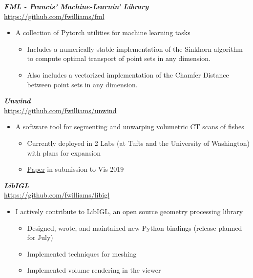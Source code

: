 \documentclass[line,10pt]{res}
\newcommand{\resumetitlemar}{0.5em}
\begin{document}
\begin{resume}
{\sl \textbf{FML - Francis' Machine-Learnin' Library}}\\
\url{https://github.com/fwilliams/fml}
\vspace{\resumetitlemar}
\begin{itemize} \itemsep -2pt
\item A collection of Pytorch utilities for machine learning tasks
\vspace{-0.4em}
\begin{itemize} \itemsep -2pt
\item Includes a numerically stable implementation of the Sinkhorn algorithm to compute optimal transport of point sets in any dimension.
\item Also includes a vectorized implementation of the Chamfer Distance between point sets in any dimension.
\end{itemize}
\end{itemize}

{\sl \textbf{Unwind}}\\
\url{https://github.com/fwilliams/unwind}
\vspace{\resumetitlemar}
\begin{itemize} \itemsep -2pt
\item A software tool for segmenting and unwarping volumetric CT scans of fishes
\vspace{-0.4em}
\begin{itemize} \itemsep -2pt
\item Currently deployed in 2 Labs (at Tufts and the University of Washington) with plans for expansion
\item \href{https://arxiv.org/abs/1904.04890}{Paper} in submission to Vis 2019
\end{itemize}
\end{itemize}

{\sl \textbf{LibIGL}}\\
\url{https://github.com/fwilliams/libigl}
\vspace{\resumetitlemar}
\begin{itemize} \itemsep -2pt
\item I actively contribute to LibIGL, an open source geometry processing library
\vspace{-0.4em}
\begin{itemize} \itemsep -2pt
\item Designed, wrote, and maintained new Python bindings (release planned for July)
\item Implemented techniques for meshing 
\item Implemented volume rendering in the viewer
\end{itemize}
\end{itemize}


\end{resume}
\end{document}
